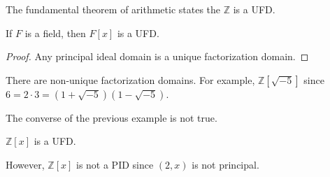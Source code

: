 \documentclass{article}                                                        %
\begin{document}
        \begin{example}
            The fundamental theorem of arithmetic states the $\mathbb{Z}$ is a
            UFD.
        \end{example}
        \begin{theorem}
            If $F$ is a field, then $F[x]$ is a UFD.
        \end{theorem}
        \begin{proof}
            Any principal ideal domain is a unique factorization domain.
        \end{proof}
        \begin{example}
            There are non-unique factorization domains. For example,
            $\mathbb{Z}[\sqrt{\minus{5}}]$ since
            $6=2\cdot{3}=(1+\sqrt{\minus{5}})(1-\sqrt{\minus{5}})$.
        \end{example}
        The converse of the previous example is not true.
        \begin{theorem}
            $\mathbb{Z}[x]$ is a UFD.
        \end{theorem}
        However, $\mathbb{Z}[x]$ is not a PID since $(2,x)$ is not principal.
\end{document}
